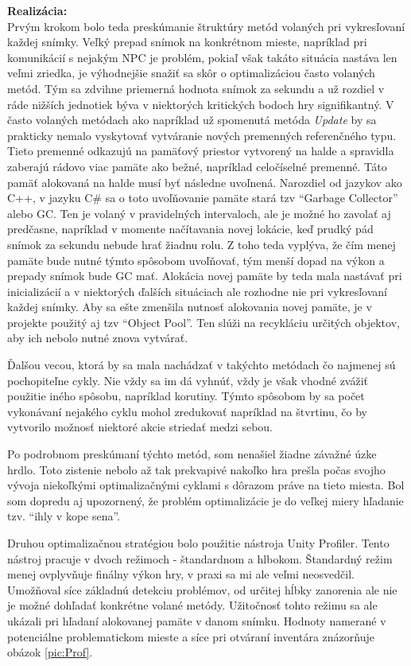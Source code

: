 \documentclass[slovak, bachelorpractice]{diploma}
\begin{document}
\textbf{Realizácia:} \\ Prvým krokom bolo teda preskúmanie štruktúry metód volaných pri vykresľovaní každej snímky. Veľký prepad snímok na konkrétnom mieste, napríklad pri komunikácií s nejakým NPC je problém,  pokiaľ však takáto situácia nastáva len veľmi zriedka, je výhodnejšie snažiť sa skôr o optimalizáciou často volaných metód. Tým sa zdvihne priemerná hodnota snímok za sekundu a už rozdiel v ráde nižších jednotiek býva v niektorých kritických bodoch hry signifikantný. V často volaných metódach ako napríklad už spomenutá metóda \textit{Update} by sa prakticky nemalo vyskytovať vytváranie nových premenných referenčného typu. Tieto premenné odkazujú na pamäťový priestor vytvorený na halde a spravidla zaberajú rádovo viac pamäte ako bežné, napríklad celočíselné premenné. Táto pamäť alokovaná na halde musí byť následne uvoľnená. Narozdiel od jazykov ako C++, v jazyku C\# sa o toto uvoľňovanie pamäte stará tzv \enquote{Garbage Collector} alebo GC. Ten je volaný v pravidelných intervaloch, ale je možné ho zavolať aj predčasne, napríklad v momente načítavania novej lokácie, keď prudký pád snímok za sekundu nebude hrať žiadnu rolu. Z toho teda vyplýva, že čím menej pamäte bude nutné týmto spôsobom uvoľňovať, tým menší dopad na výkon a prepady snímok bude GC mať. Alokácia novej pamäte by teda mala nastávať pri inicializácií a v niektorých ďalších situáciach ale rozhodne nie pri vykresľovaní každej snímky. Aby sa ešte zmenšila nutnosť alokovania novej pamäte, je v projekte použitý aj tzv \enquote{Object Pool}. Ten slúži na recykláciu určitých objektov, aby ich nebolo nutné znova vytvárať. 

Ďalšou vecou, ktorá by sa mala nachádzať v takýchto metódach čo najmenej sú pochopiteľne cykly. Nie vždy sa im dá vyhnúť, vždy je však vhodné zvážiť použitie iného spôsobu, napríklad korutiny. Týmto spôsobom by sa počet vykonávaní nejakého cyklu mohol zredukovať napríklad na štvrtinu, čo by vytvorilo možnosť niektoré akcie striedať medzi sebou.

Po podrobnom preskúmaní týchto metód, som nenašiel žiadne závažné úzke hrdlo. Toto zistenie nebolo až tak prekvapivé nakoľko hra prešla počas svojho vývoja niekoľkými optimalizačnými cyklami s dôrazom práve na tieto miesta. Bol som dopredu aj upozornený, že problém optimalizácie je do veľkej miery hľadanie tzv. \enquote{ihly v kope sena}.

Druhou optimalizačnou stratégiou bolo použitie nástroja Unity Profiler. Tento nástroj pracuje v dvoch režimoch - štandardnom a hlbokom. Štandardný režim menej ovplyvňuje finálny výkon hry, v praxi sa mi ale veľmi neosvedčil. Umožňoval síce základnú detekciu problémov, od určitej hĺbky zanorenia ale nie je možné dohľadať konkrétne volané metódy. Užitočnosť tohto režimu sa ale ukázali pri hľadaní alokovanej pamäte v danom snímku. Hodnoty namerané v potenciálne problematickom mieste a síce pri otváraní inventára znázorňuje obázok \ref{pic:Prof}.
\end{document}
